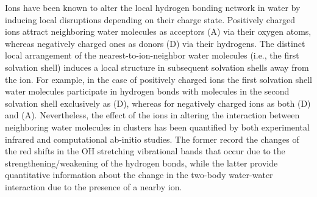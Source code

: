 \documentclass[11pt, proquest]{uwthesis}[2020/02/24]
\begin{document}
\par Ions have been known to alter the local hydrogen bonding network in water by inducing local disruptions depending on their charge state.\autocite{marcus_ions_2015,chang_recent_2006,hribar_how_2002} Positively charged ions attract neighboring water molecules as acceptors (A) via their oxygen atoms, whereas negatively charged ones as donors (D) via their hydrogens. The distinct local arrangement of the nearest-to-ion-neighbor water molecules (i.e., the first solvation shell) induces a local structure in subsequent solvation shells away from the ion. For example, in the case of positively charged ions the first solvation shell water molecules participate in hydrogen bonds with molecules in the second solvation shell exclusively as (D), whereas for negatively charged ions as both (D) and (A). Nevertheless, the effect of the ions in altering the interaction between neighboring water molecules in clusters has been quantified by both experimental infrared and computational ab-initio studies. The former record the changes of the red shifts in the OH stretching vibrational bands that occur due to the strengthening/weakening of the hydrogen bonds,\autocite{horvath_anharmonicities_2010,bush_infrared_2008,duncan_spectroscopy_1997,ayotte_spectroscopic_1999,dorsett_probing_1999} while the latter provide quantitative information about the change in the two-body water-water interaction due to the presence of a nearby ion.\autocite{xantheas_theoretical_1995,xantheas_quantitative_1996}
\end{document}
